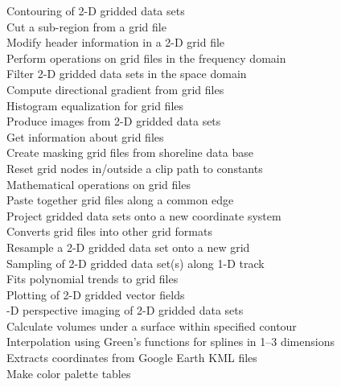 \begin{tabbing}
	\>	Contouring of 2-D gridded data sets \\ 
	\>	Cut a sub-region from a grid file \\ 
	\>	Modify header information in a 2-D grid file \\ 
	\>	Perform operations on grid files in the frequency domain \\ 
	\>	Filter 2-D gridded data sets in the space domain \\ 
	\>	Compute directional gradient from grid files \\ 
	\>	Histogram equalization for grid files \\ 
	\>	Produce images from 2-D gridded data sets \\ 
	\>	Get information about grid files \\ 
	\>	Create masking grid files from shoreline data base \\ 
	\>	Reset grid nodes in/outside a clip path to constants \\ 
	\>	Mathematical operations on grid files \\ 
	\>	Paste together grid files along a common edge \\ 
	\>	Project gridded data sets onto a new coordinate system \\ 
	\>	Converts grid files into other grid formats \\ 
	\>	Resample a 2-D gridded data set onto a new grid \\ 
	\>	Sampling of 2-D gridded data set(s) along 1-D track \\ 
	\>	Fits polynomial trends to grid files \\ 
	\>	Plotting of 2-D gridded vector fields \\ 
	-D perspective imaging of 2-D gridded data sets \\ 
	\>	Calculate volumes under a surface within specified contour \\ 
	\>	Interpolation using Green's functions for splines in 1--3 dimensions \\ 
	\>	Extracts coordinates from Google Earth KML files \\ 
	\>	Make color palette tables \\ 

\end{tabbing}

